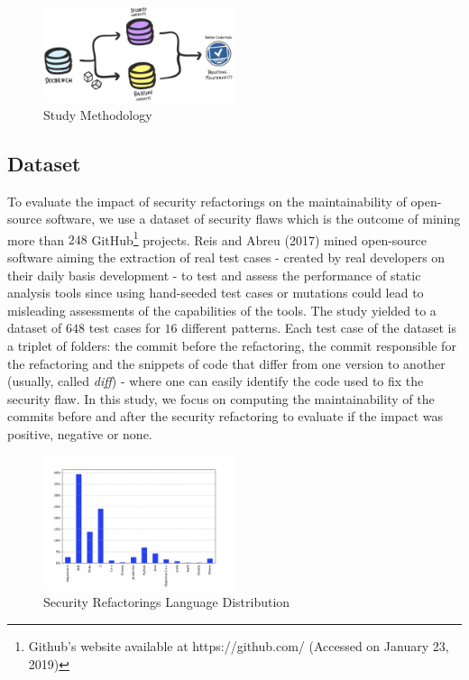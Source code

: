 \documentclass[10pt,conference]{IEEEtran}
\begin{document}
\begin{figure}[h]
 	\centering 	\includegraphics[width=0.5\textwidth]{figures/methodology.pdf}
 	\caption{Study Methodology}
	\label{fig:met}
\end{figure}

\subsection{Dataset}

To evaluate the impact of security refactorings on the maintainability of open-source software, we use a dataset of security flaws which is the outcome of mining more than $248$ GitHub\footnote{Github's website available at https://github.com/ (Accessed on January 23, 2019)} projects. Reis and Abreu (2017) mined open-source software aiming the extraction of real test cases - created by real developers on their daily basis development - to test and assess the performance of static analysis tools since using hand-seeded test cases or mutations could lead to misleading assessments of the capabilities of the tools. The study yielded to a dataset of $648$ test cases for $16$ different patterns. Each test case of the dataset is a triplet of folders: the commit before the refactoring, the commit responsible for the refactoring and the snippets of code that differ from one version to another (usually, called \textit{diff}) - where one can easily identify the code used to fix the security flaw. In this study, we focus on computing the maintainability of the commits before and after the security refactoring to evaluate if the impact was positive, negative or none.

\begin{figure}[h]
 	\centering 	\includegraphics[width=0.5\textwidth]{figures/language_dist.pdf}
 	\caption{Security Refactorings Language Distribution}
	\label{fig:lang}
\end{figure}
\end{document}
